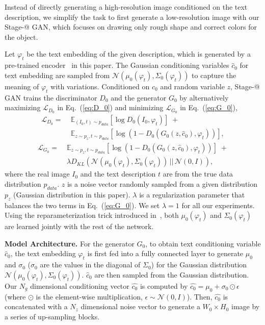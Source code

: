 \documentclass[10pt,twocolumn,letterpaper]{article}
\makeatletter
\newcommand{\Rmnum}[1]{\expandafter\@slowromancap\romannumeral #1@}
\makeatother
\begin{document}
Instead of directly generating a high-resolution image conditioned on the text description, we simplify the task to first generate a low-resolution image with our Stage-\Rmnum{1} GAN, which focuses on drawing only rough shape and correct colors for the object. 

Let $\varphi_{t}$ be the text embedding of the given description, which is generated by a pre-trained encoder~\cite{reed2016cvpr} in this paper. The Gaussian conditioning variables $\hat{c}_0$ for text embedding are sampled from $\mathcal{N}(\mu_0(\varphi_{t}), \Sigma_0(\varphi_{t}))$ to capture the meaning of $\varphi_{t}$ with variations. 
Conditioned on $\hat{c}_0$ and random variable $z$, Stage-\Rmnum{1} GAN trains the discriminator $D_0$ and the generator $G_0$ by alternatively maximizing $\mathcal{L}_{D_0}$ in Eq.~(\ref{eq:D_0}) and minimizing $\mathcal{L}_{G_0}$ in Eq.~(\ref{eq:G_0}), 
\begin{equation}\label{eq:D_0}
\begin{aligned}
\mathcal{L}_{D_0} =  &\; \mathbb{E}_{(I_{0},t) \sim {p_{data}}} [\log D_{0}(I_{0}, \varphi_{t})] \; + \\
&\; \mathbb{E}_{z \sim {p_{z}}, t \sim p_{data}} [\log(1 - D_{0}(G_{0}(z,\hat{c}_0), \varphi_{t}))],
\end{aligned}
\end{equation}
\begin{equation}\label{eq:G_0}
\begin{aligned}
\mathcal{L}_{G_0} = &\; \mathbb{E}_{z \sim {p_{z}}, t \sim p_{data}} [\log(1 - D_{0}(G_{0}(z,\hat{c}_0), \varphi_{t}))] \; + \\
                    &\; \lambda D_{KL}(\mathcal{N}(\mu_0(\varphi_{t}), \Sigma_0(\varphi_{t})) \, || \, \mathcal{N}(0, I)), 
\end{aligned}
\end{equation}
where the real image $I_0$ and the text description $t$ are from the true data distribution $p_{data}$. 
$z$ is a noise vector randomly sampled from a given distribution $p_z$ (Gaussian distribution in this paper). 
$\lambda$ is a regularization parameter that balances the two terms in Eq.~(\ref{eq:G_0}).
We set $\lambda=1$ for all our experiments. 
Using the reparameterization trick introduced in~\cite{KingmaW14}, both $\mu_0(\varphi_{t})$ and $\Sigma_0(\varphi_{t})$ are learned jointly with the rest of the network.  

\textbf{Model Architecture. }
For the generator $G_0$, to obtain text conditioning variable $\hat{c}_0$, the text embedding $\varphi_{t}$ is first fed into a fully connected layer to generate $\mu_0$ and $\sigma_0$ ($\sigma_0$ are the values in the diagonal of $\Sigma_0$) for the Gaussian distribution $\mathcal{N}(\mu_0(\varphi_{t}), \Sigma_0(\varphi_{t}))$. $\hat{c}_0$ are then sampled from the Gaussian distribution.
Our $N_g$ dimensional conditioning vector $\hat{c_0}$ is computed by $\hat{c_0} = \mu_0 + \sigma_0 \odot \epsilon$ (where $\odot$ is the element-wise multiplication, $\epsilon  \sim \mathcal{N}(0, I)$). 
Then, $\hat{c_0}$ is concatenated with a $N_z$ dimensional noise vector to generate a $W_{0} \times H_{0}$ image by a series of up-sampling blocks.  
\end{document}

